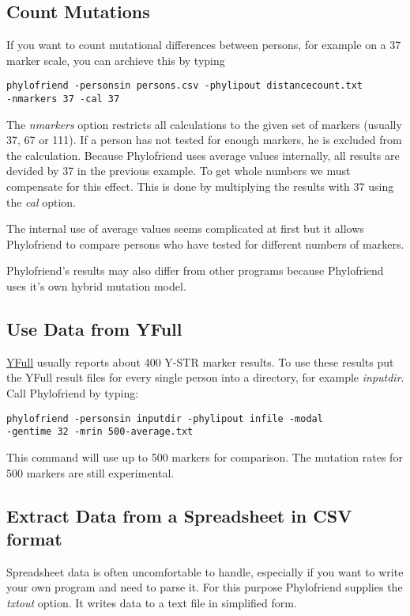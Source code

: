 \subsection{Count Mutations}

If you want to count mutational differences between
persons, for example on a 37 marker scale, you can
archieve this by typing

\noindent\texttt{phylofriend -personsin persons.csv -phylipout distancecount.txt\\
-nmarkers 37 -cal 37}

The \emph{nmarkers} option restricts all calculations
to the given set of markers (usually 37, 67 or 111). If
a person has not tested for enough markers, he is excluded
from the calculation. Because Phylofriend uses average
values internally, all results are devided by 37 in 
the previous example. To get whole numbers we must compensate
for this effect. This is done by multiplying the results
with 37 using the \emph{cal} option.

The internal use of average values seems complicated at
first but it allows Phylofriend to compare persons who
have tested for different numbers of markers.

Phylofriend's results may also differ from other programs
because Phylo\-friend uses it's own hybrid mutation model.


\subsection{Use Data from YFull}

\href{http://yfull.com/}{YFull} usually reports about 400
Y-STR marker results. To use these results put the YFull 
result files for every single person into a directory, for
example \emph{inputdir}. Call Phylofriend by typing:

\noindent\texttt{phylofriend -personsin inputdir -phylipout infile -modal\\
-gentime 32 -mrin 500-average.txt}

This command will use up to 500 markers for comparison. The
mutation rates for 500 markers are still experimental.



\subsection{Extract Data from a Spreadsheet in CSV format}

Spreadsheet data is often uncomfortable to handle, especially
if you want to write your own program and need to parse it.
For this purpose Phylofriend supplies the \emph{txtout}
option. It writes data to a text file in simplified form.

